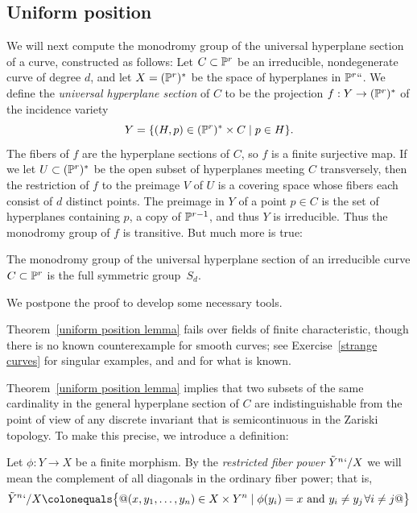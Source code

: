 \subsection*{Uniform position}


We will next compute the monodromy group of the  universal hyperplane
section of a curve, constructed as follows:
Let $C \subset {\mathbb P}^r$ be an irreducible, nondegenerate curve of degree
$d$, and let $X = ({\mathbb P}^r)^*$ be the space of hyperplanes in ${\mathbb P}^r``$.
We define the \emph{universal hyperplane section} of $C$ to be the
%
projection  $f: Y\to ({\mathbb P}^r)^*$ of the incidence variety
$$
Y = \{ (H, p) \in ({\mathbb P}^r)^* \times C \mid p \in H \}.
$$
The fibers of $f$ are the hyperplane
sections of $C$, so $f$ is a finite surjective map. If we let $U\subset
({\mathbb P}^r)^*$ be the open subset of hyperplanes
meeting $C$ transversely, then the restriction of $f$ to the preimage $V$
of $U$ is a covering space
whose fibers each consist of $d$ distinct points. The preimage in $Y$
of a point $p\in C$ is the set of hyperplanes containing
$p$, a copy of ${\mathbb P}^{r-1}$, and thus $Y$ is irreducible. Thus the
monodromy group of $f$ is transitive. But much more is true:

\begin{theorem}
\label{uniform position lemma}
The
monodromy group of the universal hyperplane section of an irreducible
curve $C \subset {\mathbb P}^r$ is the full symmetric group~$S_d$.
%
\end{theorem}

We postpone the proof to develop some necessary tools.

Theorem~\ref{uniform position lemma} fails over fields of finite
characteristic, though there is no known counterexample for smooth
curves; see Exercise~\ref{strange curves} for singular examples, and
\cite{Rathmann} and \cite{Kadets} for what is known.

Theorem~\ref{uniform position lemma} implies that two subsets of the
same cardinality in the general hyperplane section of $C$
are indistinguishable from the point of view of any discrete invariant
that is semicontinuous in the Zariski topology. To make this precise,
we introduce a definition:

\begin{definition}
Let $\phi : Y \to X$ be a finite morphism. By the
\emph{restricted fiber power}
%
$\tilde Y^n`/X$ we will mean the complement of all diagonals in
the ordinary fiber power; that is,
$$
\tilde Y^n`/X \colonequals  \bigl\{@ (x, y_1,\dots, y_n) \in X \times Y^n \mid
\phi(y_i) = x \text{ and } y_i \neq y_j \; \forall i \neq j @\bigr\}
$$
\end{definition}

